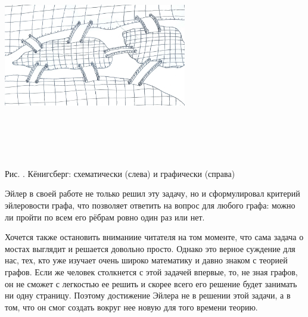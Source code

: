 \begin{center}
\includegraphics[width=8cm, height=9cm,keepaspectratio]{chapters/1/images/Keningsberg}
\;\ \;\ \;\ \;\ \;\ \;\ \;\ \;\ \;\ \;\
\end{center}

\begin{center}\small Рис. \images. Кёнигсберг: схематически (слева) и графически (справа)\end{center}

	Эйлер в своей работе не только решил эту задачу, но и сформулировал критерий эйлеровости графа, что позволяет ответить на вопрос для 
	любого графа: можно ли пройти по всем его рёбрам ровно один раз или нет. 
	
	Хочется также остановить вниманиие читателя на том моменте, что сама задача о мостах выглядит и решается довольно просто. Однако
	это верное суждение для нас, тех, кто уже изучает очень широко математику и давно знаком с теорией графов. Если же человек столкнется с
	этой задачей впервые, то, не зная графов, он не сможет с легкостью ее решить и скорее всего его решение будет занимать ни одну страницу.
	Поэтому достижение Эйлера не в решении этой задачи, а в том, что он смог создать вокруг нее новую для того времени теорию.	
	
